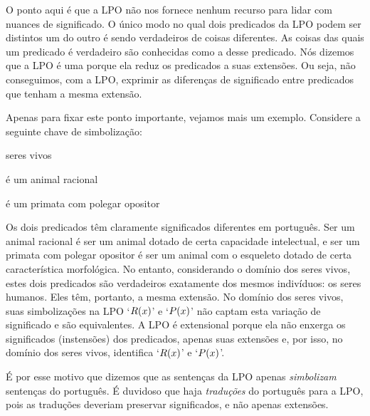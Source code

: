 O ponto aqui é que a LPO não nos fornece nenhum recurso para lidar com nuances de significado.
O único modo no qual dois predicados da LPO podem ser distintos um do outro é sendo verdadeiros de coisas diferentes.
As coisas das quais um predicado é verdadeiro são conhecidas como a  desse predicado.
Nós dizemos que a LPO é uma  porque ela reduz os predicados a suas extensões.
Ou seja, não conseguimos, com a LPO, exprimir as diferenças de significado entre predicados que tenham a mesma extensão.    

Apenas para fixar este ponto importante, vejamos mais um exemplo.
Considere a seguinte chave de simbolização:
\begin{center}
	\begin{ekey}
		\item[\text{domínio}] seres vivos
		\item[\atom{R}{x}]  é um animal racional
		\item[\atom{P}{x}]  é um primata com polegar opositor
	\end{ekey}
\end{center}
Os dois predicados têm claramente significados diferentes em português.
Ser um animal racional é ser um animal dotado de certa capacidade intelectual, e ser um primata com polegar opositor é ser um animal com o esqueleto dotado de certa característica morfológica.
No entanto, considerando o domínio dos seres vivos, estes dois predicados são verdadeiros exatamente dos mesmos indivíduos:
os seres humanos.
Eles têm, portanto, a mesma extensão.
No domínio dos seres vivos, suas simbolizações na LPO `$\mathord{R}(x)$' e `$\mathord{P}(x)$' não captam esta variação de significado e são equivalentes.
A LPO é extensional porque ela não enxerga os significados (instensões) dos predicados, apenas suas extensões e, por isso, no domínio dos seres vivos, identifica `$\mathord{R}(x)$' e `$\mathord{P}(x)$'.

É por esse motivo que dizemos que as sentenças da LPO apenas \emph{simbolizam} sentenças do português.
É duvidoso que haja \emph{traduções} do português para a LPO, pois as traduções deveriam preservar significados, e não apenas extensões.


